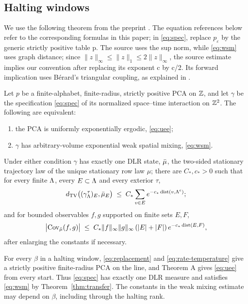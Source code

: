 \subsection{Halting windows}\label{sec:gibbs-halting}

We use the following theorem from the preprint \cite{dmSpaceTime}. The equation references below refer to the corresponding formulas in this paper; in \eqref{eq:spec}, replace \(p_\varepsilon\) by the generic strictly positive table p. The source uses the sup norm, while \eqref{eq:wsm} uses graph distance; since \(\|z\|_\infty\le\|z\|_1\le2\|z\|_\infty\), the source estimate implies our convention after replacing its exponent c by c/2. Its forward implication uses B\'erard's triangular coupling, as explained in \cite{dmSpaceTime}.

\begin{transfer}\label{thm:transfer}
Let $p$ be a finite-alphabet, finite-radius, strictly positive PCA on $\mathbb Z$, and let $\gamma$ be the specification \eqref{eq:spec} of its normalized space--time interaction on $\mathbb Z^2$. The following are equivalent:
\begin{enumerate}[label=(\roman*)]
\item the PCA is uniformly exponentially ergodic, \eqref{eq:uee};
\item $\gamma$ has arbitrary-volume exponential weak spatial mixing, \eqref{eq:wsm}.
\end{enumerate}
Under either condition $\gamma$ has exactly one DLR state, $\bar\mu$, the two-sided stationary trajectory law of the unique stationary row law $\mu$; there are $C_*,c_*>0$ such that for every finite $\Lambda$, every $E\subset\Lambda$ and every exterior $\tau$,
\begin{equation}
d_{\mathrm{TV}}\bigl((\gamma^\tau_\Lambda)_E,\bar\mu_E\bigr)\;\le\;C_*\sum_{v\in E}e^{-c_*\operatorname{dist}(v,\Lambda^c)};
\label{eq:conv}
\end{equation}
and for bounded observables $f,g$ supported on finite sets $E,F$,
\begin{equation}
\bigl|\operatorname{Cov}_{\bar\mu}(f,g)\bigr|\;\le\;C_*\|f\|_\infty\|g\|_\infty\,(|E|+|F|)\,e^{-c_*\operatorname{dist}(E,F)},
\label{eq:cluster}
\end{equation}
after enlarging the constants if necessary.
\end{transfer}

For every \(\beta\) in a halting window, \eqref{eq:replacement} and \eqref{eq:rate-temperature} give a strictly positive finite-radius PCA on the line, and Theorem A gives \eqref{eq:uee} from every start. Thus \eqref{eq:spec} has exactly one DLR measure and satisfies \eqref{eq:wsm} by Theorem~\ref{thm:transfer}. The constants in the weak mixing estimate may depend on \(\beta\), including through the halting rank.

